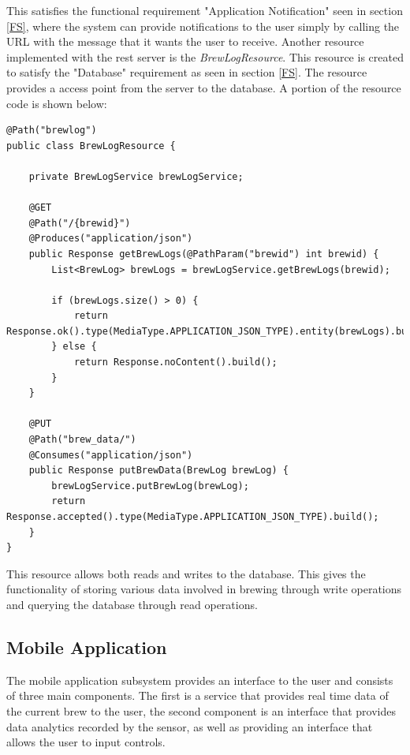 \documentclass{article}
\begin{document}
\noindent This satisfies the functional requirement "Application Notification" seen in section \ref{FS}, where the system can provide notifications to the user simply by calling the URL with the message that it wants the user to receive.
\linebreak
\linebreak
\noindent Another resource implemented with the \gls{rest} server is the \textit{BrewLogResource}. This \gls{resource} is created to satisfy the "Database" requirement as seen in section \ref{FS}. The resource provides a access point from the server to the database. A portion of the resource code is shown below:
 
\begin{lstlisting}
@Path("brewlog")
public class BrewLogResource {

    private BrewLogService brewLogService;
    
    @GET
    @Path("/{brewid}")
    @Produces("application/json")
    public Response getBrewLogs(@PathParam("brewid") int brewid) {
        List<BrewLog> brewLogs = brewLogService.getBrewLogs(brewid);

        if (brewLogs.size() > 0) {
            return Response.ok().type(MediaType.APPLICATION_JSON_TYPE).entity(brewLogs).build();
        } else {
            return Response.noContent().build();
        }
    }

    @PUT
    @Path("brew_data/")
    @Consumes("application/json")
    public Response putBrewData(BrewLog brewLog) {
        brewLogService.putBrewLog(brewLog);
        return Response.accepted().type(MediaType.APPLICATION_JSON_TYPE).build();
    }
}
\end{lstlisting}

This resource allows both reads and writes to the database. This gives the functionality of storing various data involved in brewing through write operations and querying the database through read operations. 

\subsection{Mobile Application}\label{subsec:mobile-app}
The mobile application subsystem provides an interface to the user and consists of three main components. The first is a service that provides real time data of the current brew to the user, the second component is an interface that provides data analytics recorded by the sensor, as well as providing an interface that allows the user to input controls.
\end{document}
